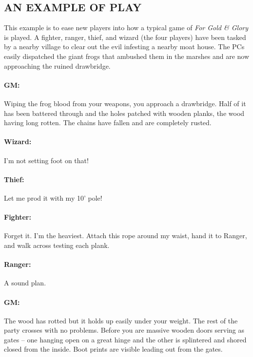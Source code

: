 \begin{multicols}{2}
\section{AN EXAMPLE OF PLAY}
This example is to ease new players into how a typical game of \textit{For Gold \& Glory}\texttrademark{} is played.  A fighter, ranger, thief, and wizard (the four players) have been tasked by a nearby village to clear out the evil infesting a nearby moat house.  The PCs easily dispatched the giant frogs that ambushed them in the marshes and are now approaching the ruined drawbridge.

\paragraph{GM:} Wiping the frog blood from your weapons, you approach a drawbridge.  Half of it has been battered through and the holes patched with wooden planks, the wood having long rotten.  The chains have fallen and are completely rusted.

\paragraph{Wizard:} I'm not setting foot on that!

\paragraph{Thief:} Let me prod it with my 10' pole!

\paragraph{Fighter:} Forget it.  I'm the heaviest.  Attach this rope around my waist, hand it to Ranger, and walk across testing each plank.

\paragraph{Ranger:} A sound plan.

\paragraph{GM:} The wood has rotted but it holds up easily under your weight.  The rest of the party crosses with no problems.  Before you are massive wooden doors serving as gates -- one hanging open on a great hinge and the other is splintered and shored closed from the inside.  Boot prints are visible leading out from the gates.


\end{multicols}
